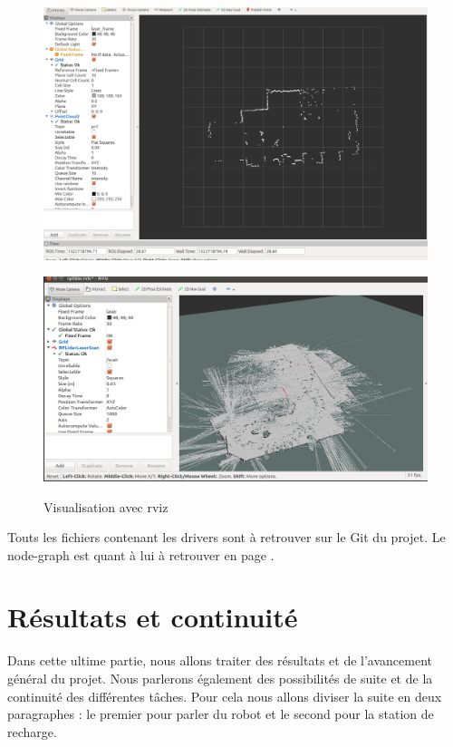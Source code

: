 \documentclass[french]{rapportENSTAB}
\begin{document}
\begin{figure}[h]
\centering
\begin{minipage}[b]{.5\textwidth}
  \centering
  \includegraphics[width=.95\linewidth]{images/robot/lidar.png}
  \label{fig:archi elec}
\end{minipage}%
%
\begin{minipage}[b]{.61\textwidth}
  \centering
  \includegraphics[width=.95\linewidth]{images/robot/lidarslam.png}
  \label{fig:archi elec}
\end{minipage}
%


\vspace{3mm}
\caption{Visualisation avec rviz}
\label{fig:archi elec}
\end{figure}


Touts les fichiers contenant les drivers sont à retrouver sur le Git du projet. Le node-graph est quant à lui à retrouver en page \pageref{annexe5}.

\section{Résultats et continuité}
Dans cette ultime partie, nous allons traiter des résultats et de l'avancement général du projet. Nous parlerons également des possibilités de suite et de la continuité des différentes tâches. Pour cela nous allons diviser la suite en deux paragraphes : le premier pour parler du robot et le second pour la station de recharge.\\
\end{document}
